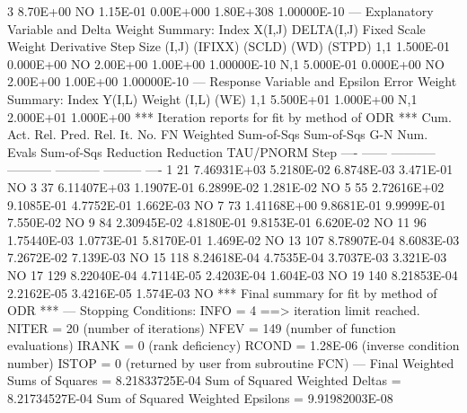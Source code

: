 {{           3  8.70E+00       NO  1.15E-01  0.00E+000  1.80E+308   1.00000E-10
\phantom{blank line}
 --- Explanatory Variable and Delta Weight Summary:
\phantom{blank line}
       Index      X(I,J)  DELTA(I,J)    Fixed     Scale    Weight    Derivative
                                                                      Step Size
       (I,J)                          (IFIXX)    (SCLD)      (WD)        (STPD)
\phantom{blank line}
         1,1   1.500E-01   0.000E+00       NO  2.00E+00  1.00E+00   1.00000E-10
         N,1   5.000E-01   0.000E+00       NO  2.00E+00  1.00E+00   1.00000E-10
\phantom{blank line}
 --- Response Variable and Epsilon Error Weight Summary:
\phantom{blank line}
       Index      Y(I,L)      Weight
       (I,L)                    (WE)
\phantom{blank line}
         1,1   5.500E+01   1.000E+00
         N,1   2.000E+01   1.000E+00
\phantom{blank line}
 *** Iteration reports for fit by method of ODR ***
\phantom{blank line}
\phantom{blank line}
         Cum.                 Act. Rel.   Pred. Rel.
  It.  No. FN     Weighted   Sum-of-Sqs   Sum-of-Sqs              G-N
 Num.   Evals   Sum-of-Sqs    Reduction    Reduction  TAU/PNORM  Step
 ----  ------  -----------  -----------  -----------  ---------  ----
\phantom{blank line}
    1      21  7.46931E+03   5.2180E-02   6.8748E-03  3.471E-01    NO
    3      37  6.11407E+03   1.1907E-01   6.2899E-02  1.281E-02    NO
    5      55  2.72616E+02   9.1085E-01   4.7752E-01  1.662E-03    NO
    7      73  1.41168E+00   9.8681E-01   9.9999E-01  7.550E-02    NO
    9      84  2.30945E-02   4.8180E-01   9.8153E-01  6.620E-02    NO
   11      96  1.75440E-03   1.0773E-01   5.8170E-01  1.469E-02    NO
   13     107  8.78907E-04   8.6083E-03   7.2672E-02  7.139E-03    NO
   15     118  8.24618E-04   4.7535E-04   3.7037E-03  3.321E-03    NO
   17     129  8.22040E-04   4.7114E-05   2.4203E-04  1.604E-03    NO
   19     140  8.21853E-04   2.2162E-05   3.4216E-05  1.574E-03    NO
\phantom{blank line}
 *** Final summary for fit by method of ODR ***
\phantom{blank line}
 --- Stopping Conditions:
         INFO =     4 ==> iteration limit reached.
        NITER =    20          (number of iterations)
         NFEV =   149          (number of function evaluations)
        IRANK =     0          (rank deficiency)
        RCOND =     1.28E-06   (inverse condition number)
        ISTOP =     0          (returned by user from subroutine FCN)
\phantom{blank line}
 --- Final Weighted Sums of Squares       =                     8.21833725E-04
         Sum of Squared Weighted Deltas   =    8.21734527E-04
         Sum of Squared Weighted Epsilons =    9.91982003E-08
}}
